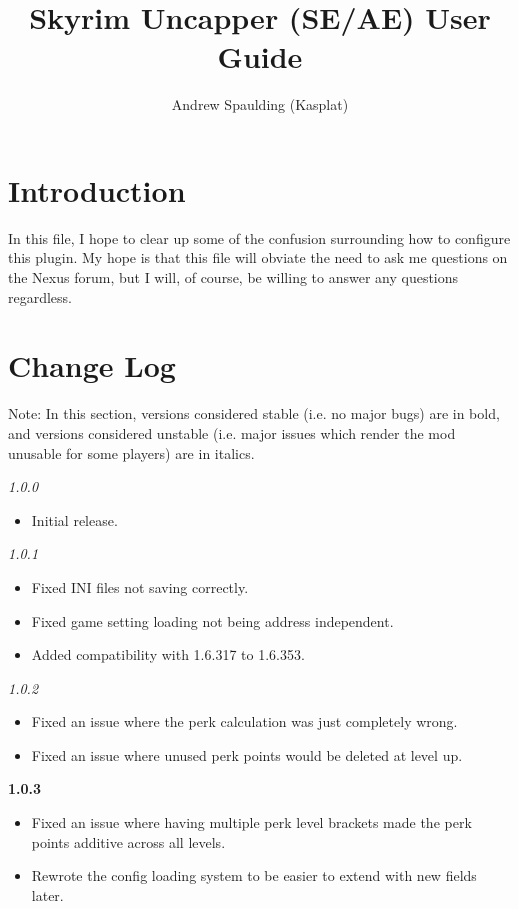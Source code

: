 \documentclass[12pt]{amsart}
\title{Skyrim Uncapper (SE/AE) User Guide}
\author{Andrew Spaulding (Kasplat)}
\begin{document}
\maketitle
\pagebreak

\newcommand{\startblock}{\begin{minipage}{\textwidth}}
\newcommand{\stopblock}{\end{minipage}}

\section{Introduction}

In this file, I hope to clear up some of the confusion surrounding how to
configure this plugin. My hope is that this file will obviate the need
to ask me questions on the Nexus forum, but I will, of course, be willing
to answer any questions regardless.

\startblock
\section{Change Log}

Note: In this section, versions considered stable (i.e. no major bugs) are in
bold, and versions considered unstable (i.e. major issues which render the mod
unusable for some players) are in italics.

\emph{1.0.0}
\begin{itemize}
    \item Initial release.
\end{itemize}
\stopblock

\startblock
\emph{1.0.1}
\begin{itemize}
    \item Fixed INI files not saving correctly.
    \item Fixed game setting loading not being address independent.
    \item Added compatibility with 1.6.317 to 1.6.353.
\end{itemize}
\stopblock

\startblock
\emph{1.0.2}
\begin{itemize}
    \item Fixed an issue where the perk calculation was just completely wrong.
    \item Fixed an issue where unused perk points would be deleted at level up.
\end{itemize}
\stopblock

\startblock
\textbf{1.0.3}
\begin{itemize}
    \item Fixed an issue where having multiple perk level brackets made the perk
          points additive across all levels.
    \item Rewrote the config loading system to be easier to extend with new
          fields later.
\end{itemize}
\stopblock
\end{document}
